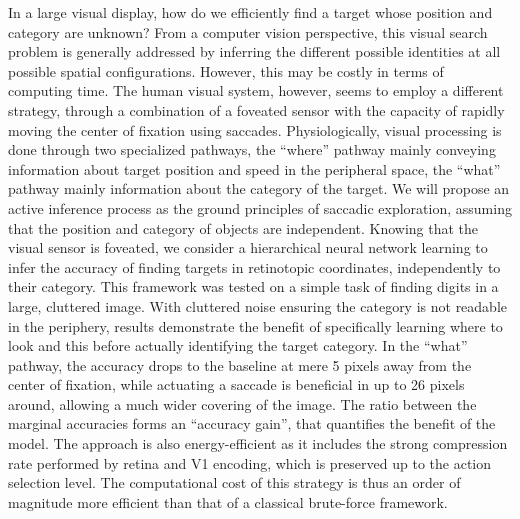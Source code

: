 In a large visual display, how do we efficiently find a target whose position and category are unknown? From a computer vision perspective, this visual search problem is generally addressed by inferring the different possible identities at all possible spatial configurations. However, this may be costly in terms of computing time. The human visual system, however, seems to employ a different strategy, through a combination of a foveated sensor with the capacity of rapidly moving the center of fixation using saccades. Physiologically, visual processing is done through two specialized pathways, the ``where'' pathway mainly conveying information about target position and speed in the peripheral space, the ``what'' pathway mainly information about the category of the target. We will propose an active inference process as the ground principles of saccadic exploration, assuming that the position and category of objects are independent. Knowing that the visual sensor is foveated, we consider a hierarchical neural network learning to infer the accuracy of finding targets in retinotopic coordinates, independently to their category. This framework was tested on a simple task of finding digits in a large, cluttered image. With cluttered noise ensuring the category is not readable in the periphery, results demonstrate the benefit of specifically learning where to look and this before actually identifying the target category. In the ``what'' pathway, the accuracy drops to the baseline at mere 5 pixels away from the center of fixation, while actuating a saccade is beneficial in up to 26 pixels around, allowing a much wider covering of the image. The ratio between the marginal accuracies forms an ``accuracy gain'', that quantifies the benefit of the model. %
The approach is also energy-efficient as it includes the strong compression rate performed by retina and V1 encoding, which is preserved up to the action selection level. The computational cost of this strategy is thus an order of magnitude more efficient than that of a classical brute-force framework.
%
%
%
